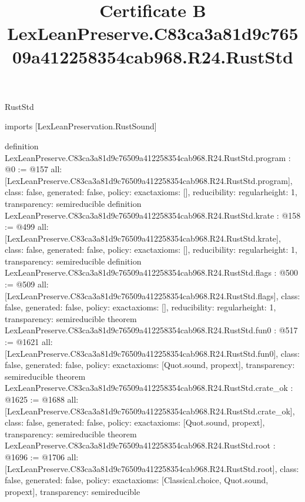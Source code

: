 \begin{lexlean}{RustStd}
\title{Certificate B LexLeanPreserve.C83ca3a81d9c76509a412258354cab968.R24.RustStd}
\begin{coremodule}
imports [LexLeanPreservation.RustSound]

definition LexLeanPreserve.C83ca3a81d9c76509a412258354cab968.R24.RustStd.program : @0 := @157 {
  all: [LexLeanPreserve.C83ca3a81d9c76509a412258354cab968.R24.RustStd.program],
  class: false,
  generated: false,
  policy: exact{axioms: []},
  reducibility: regular{height: 1},
  transparency: semireducible
}
definition LexLeanPreserve.C83ca3a81d9c76509a412258354cab968.R24.RustStd.krate : @158 := @499 {
  all: [LexLeanPreserve.C83ca3a81d9c76509a412258354cab968.R24.RustStd.krate],
  class: false,
  generated: false,
  policy: exact{axioms: []},
  reducibility: regular{height: 1},
  transparency: semireducible
}
definition LexLeanPreserve.C83ca3a81d9c76509a412258354cab968.R24.RustStd.flags : @500 := @509 {
  all: [LexLeanPreserve.C83ca3a81d9c76509a412258354cab968.R24.RustStd.flags],
  class: false,
  generated: false,
  policy: exact{axioms: []},
  reducibility: regular{height: 1},
  transparency: semireducible
}
theorem LexLeanPreserve.C83ca3a81d9c76509a412258354cab968.R24.RustStd.fun0 : @517 := @1621 {
  all: [LexLeanPreserve.C83ca3a81d9c76509a412258354cab968.R24.RustStd.fun0],
  class: false,
  generated: false,
  policy: exact{axioms: [Quot.sound, propext]},
  transparency: semireducible
}
theorem LexLeanPreserve.C83ca3a81d9c76509a412258354cab968.R24.RustStd.crate_ok : @1625 := @1688 {
  all: [LexLeanPreserve.C83ca3a81d9c76509a412258354cab968.R24.RustStd.crate_ok],
  class: false,
  generated: false,
  policy: exact{axioms: [Quot.sound, propext]},
  transparency: semireducible
}
theorem LexLeanPreserve.C83ca3a81d9c76509a412258354cab968.R24.RustStd.root : @1696 := @1706 {
  all: [LexLeanPreserve.C83ca3a81d9c76509a412258354cab968.R24.RustStd.root],
  class: false,
  generated: false,
  policy: exact{axioms: [Classical.choice, Quot.sound, propext]},
  transparency: semireducible
}


\end{coremodule}
\end{lexlean}
